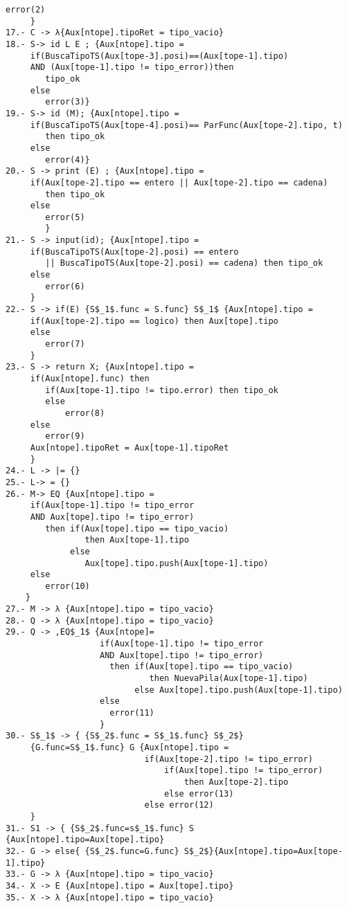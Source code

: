 \documentclass[a4paper, 12pt]{article}
\begin{document}
\begin{lstlisting}[style=EstadosAutomataST]
            error(2)
     }
17.- C -> λ{Aux[ntope].tipoRet = tipo_vacio}
18.- S-> id L E ; {Aux[ntope].tipo =
     if(BuscaTipoTS(Aux[tope-3].posi)==(Aux[tope-1].tipo)
     AND (Aux[tope-1].tipo != tipo_error))then
        tipo_ok
     else
        error(3)}
19.- S-> id (M); {Aux[ntope].tipo =
     if(BuscaTipoTS(Aux[tope-4].posi)== ParFunc(Aux[tope-2].tipo, t)
        then tipo_ok
     else
        error(4)}
20.- S -> print (E) ; {Aux[ntope].tipo =
     if(Aux[tope-2].tipo == entero || Aux[tope-2].tipo == cadena)
        then tipo_ok
     else
        error(5)
        }
21.- S -> input(id); {Aux[ntope].tipo =
     if(BuscaTipoTS(Aux[tope-2].posi) == entero
        || BuscaTipoTS(Aux[tope-2].posi) == cadena) then tipo_ok
     else
        error(6)
     }
22.- S -> if(E) {S$_1$.func = S.func} S$_1$ {Aux[ntope].tipo =
     if(Aux[tope-2].tipo == logico) then Aux[tope].tipo
     else
        error(7)
     }
23.- S -> return X; {Aux[ntope].tipo =
     if(Aux[ntope].func) then
        if(Aux[tope-1].tipo != tipo.error) then tipo_ok
        else
            error(8)
     else
        error(9)
     Aux[ntope].tipoRet = Aux[tope-1].tipoRet
     }
24.- L -> |= {}
25.- L-> = {}
26.- M-> EQ {Aux[ntope].tipo =
     if(Aux[tope-1].tipo != tipo_error
     AND Aux[tope].tipo != tipo_error)
        then if(Aux[tope].tipo == tipo_vacio)
                then Aux[tope-1].tipo
             else
                Aux[tope].tipo.push(Aux[tope-1].tipo)
     else
        error(10)
    }
27.- M -> λ {Aux[ntope].tipo = tipo_vacio}
28.- Q -> λ {Aux[ntope].tipo = tipo_vacio}
29.- Q -> ,EQ$_1$ {Aux[ntope]=
                   if(Aux[tope-1].tipo != tipo_error
                   AND Aux[tope].tipo != tipo_error)
                     then if(Aux[tope].tipo == tipo_vacio)
                             then NuevaPila(Aux[tope-1].tipo)
                          else Aux[tope].tipo.push(Aux[tope-1].tipo)
                   else
                     error(11)
                   }
30.- S$_1$ -> { {S$_2$.func = S$_1$.func} S$_2$}
     {G.func=S$_1$.func} G {Aux[ntope].tipo =
                            if(Aux[tope-2].tipo != tipo_error)
                                if(Aux[tope].tipo != tipo_error)
                                    then Aux[tope-2].tipo
                                else error(13)
                            else error(12)
     }
31.- S1 -> { {S$_2$.func=s$_1$.func} S {Aux[ntope].tipo=Aux[tope].tipo}
32.- G -> else{ {S$_2$.func=G.func} S$_2$}{Aux[ntope].tipo=Aux[tope-1].tipo}
33.- G -> λ {Aux[ntope].tipo = tipo_vacio}
34.- X -> E {Aux[ntope].tipo = Aux[tope].tipo}
35.- X -> λ {Aux[ntope].tipo = tipo_vacio}

\end{lstlisting}
\end{document}
